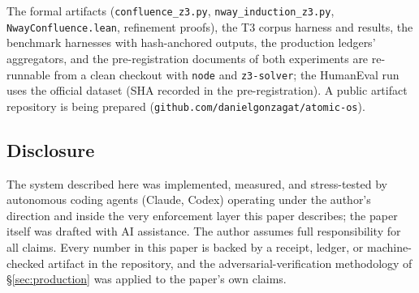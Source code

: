 The formal artifacts (\texttt{confluence\_z3.py}, \texttt{nway\_induction\_z3.py},
\texttt{NwayConfluence.lean}, refinement proofs), the T3 corpus harness and
results, the benchmark harnesses with hash-anchored outputs, the production
ledgers' aggregators, and the pre-registration documents of both experiments are
re-runnable from a clean checkout with \texttt{node} and \texttt{z3-solver}; the
HumanEval run uses the official dataset (SHA recorded in the pre-registration).
A public artifact repository is being prepared
(\texttt{github.com/danielgonzagat/atomic-os}).

\subsection*{Disclosure}

The system described here was implemented, measured, and stress-tested by
autonomous coding agents (Claude, Codex) operating under the author's direction
and inside the very enforcement layer this paper describes; the paper itself was
drafted with AI assistance. The author assumes full responsibility for all
claims. Every number in this paper is backed by a receipt, ledger, or
machine-checked artifact in the repository, and the adversarial-verification
methodology of \S\ref{sec:production} was applied to the paper's own claims.
